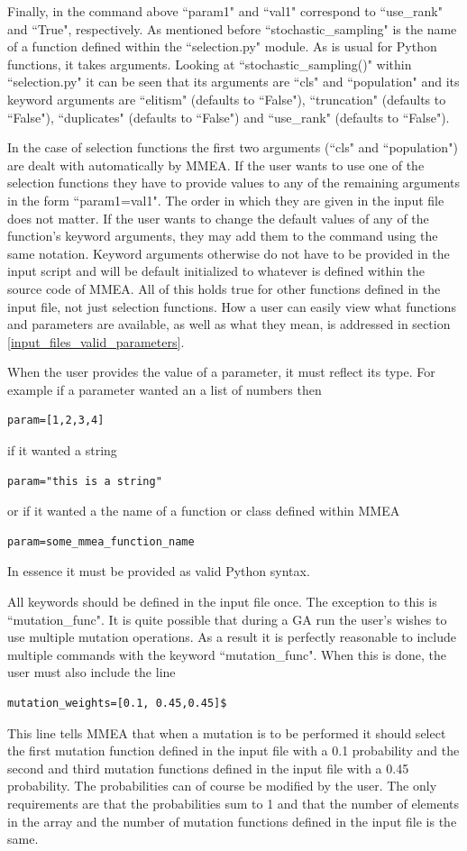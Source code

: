 \documentclass[12pt]{article}
\begin{document}
Finally, in the command above ``param1" and ``val1" correspond to ``use\_rank" and ``True", respectively. As mentioned before ``stochastic\_sampling" is the name of a function defined within the ``selection.py" module. As is usual for Python functions, it takes arguments. Looking at ``stochastic\_sampling()" within ``selection.py" it can be seen that its arguments are ``cls" and ``population" and its keyword arguments are ``elitism" (defaults to ``False"), ``truncation" (defaults to ``False"), ``duplicates" (defaults to ``False") and ``use\_rank" (defaults to ``False").

In the case of selection functions the first two arguments (``cls" and ``population") are dealt with automatically by MMEA. If the user wants to use one of the selection functions they have to provide values to any of the remaining arguments in the form ``param1=val1". The order in which they are given in the input file does not matter. If the user wants to change the default values of any of the function's keyword arguments, they may add them to the command using the same notation. Keyword arguments otherwise do not have to be provided in the input script and will be default initialized to whatever is defined within the source code of MMEA. All of this holds true for other functions defined in the input file, not just selection functions. How a user can easily view what functions and parameters are available, as well as what they mean, is addressed in section \ref{input_files_valid_parameters}.

When the user provides the value of a parameter, it must reflect its type. For example if a parameter wanted an a list of numbers then
\begin{verbatim}
param=[1,2,3,4]
\end{verbatim}
if it wanted a string
\begin{verbatim}
param="this is a string"
\end{verbatim}
or if it wanted a the name of a function or class defined within MMEA
\begin{verbatim}
param=some_mmea_function_name
\end{verbatim}
In essence it must be provided as valid Python syntax.

All keywords should be defined in the input file once. The exception to this is ``mutation\_func". It is quite possible that during a GA run the user's wishes to use multiple mutation operations. As a result it is perfectly reasonable to include multiple commands with the keyword  ``mutation\_func". When this is done, the user must also include the line 
\begin{verbatim}
mutation_weights=[0.1, 0.45,0.45]$
\end{verbatim}
This line tells MMEA that when a mutation is to be performed it should select the first mutation function defined in the input file with a 0.1 probability and the second and third mutation functions defined in the input file with a 0.45 probability. The probabilities can of course be modified by the user. The only requirements are that the probabilities sum to 1 and that the number of elements in the array and the number of mutation functions defined in the input file is the same.
\end{document}

